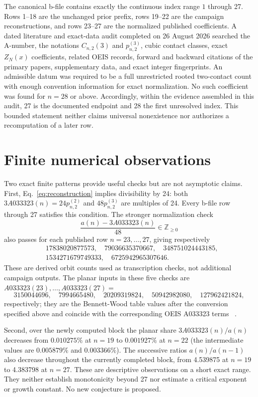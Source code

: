 \documentclass[11pt]{article}
\theoremstyle{definition}
\theoremstyle{remark}
\begin{document}
The canonical b-file contains exactly the continuous index range $1$ through
27.  Rows 1--18 are the unchanged prior prefix, rows 19--22 are the campaign
reconstructions, and rows 23--27 are the normalized published coefficients.
A dated literature and exact-data audit completed on 26 August 2026 searched
the A-number, the notations $C_{n,2}(3)$ and $p_{n,2}^{(3)}$, cubic contact
classes, exact $Z_N(x)$ coefficients, related OEIS records, forward and
backward citations of the primary papers, supplementary data, and exact
integer fingerprints.  An admissible datum was required to be a full
unrestricted rooted two-contact count with enough convention information for
exact normalization.  No such coefficient was found for $n=28$ or above.
Accordingly, within the evidence assembled in this audit, 27 is the documented
endpoint and 28 the first unresolved index.  This bounded statement neither
claims universal nonexistence nor authorizes a recomputation of a later row.

\section{Finite numerical observations}

Two exact finite patterns provide useful checks but are not asymptotic claims.
First, Eq.~\eqref{eq:reconstruction} implies divisibility by 24: both
$3A033323(n)=24p_{n,2}^{(2)}$ and $48p_{n,2}^{(3)}$ are multiples of 24.
Every b-file row through 27 satisfies this condition.  The stronger
normalization check
\[
 \frac{a(n)-3A033323(n)}{48}\in\mathbb Z_{\geq0}
\]
also passes for each published row $n=23,\ldots,27$, giving respectively
\[
\begin{aligned}
&17838020877573,\quad 79036635370667,\quad 348751024443185,\\
&1534271679749333,\quad 6725942965307646.
\end{aligned}
\]
These are derived orbit counts used as transcription checks, not additional
campaign outputs.  The planar inputs in these five checks are
$A033323(23),\ldots,A033323(27)=$
\[
3150044696,\quad 7994665480,\quad 20209319824,\quad
50942982080,\quad 127962421824,
\]
respectively; they are the Bennett-Wood table values after the conversion
specified above and coincide with the corresponding OEIS A033323 terms~
\cite{BennettWoodEtAl1998,OEISA033323}.

Second, over the newly computed block the planar share
$3A033323(n)/a(n)$ decreases from $0.010275\%$ at $n=19$ to $0.001927\%$ at
$n=22$ (the intermediate values are $0.005879\%$ and $0.003366\%$).  The
successive ratios $a(n)/a(n-1)$ also decrease throughout the currently
completed block, from 4.539875 at $n=19$ to 4.383798 at $n=27$.  These are
descriptive observations on a short exact range.  They neither establish
monotonicity beyond 27 nor estimate a critical exponent or growth constant.
No new conjecture is proposed.
\end{document}
